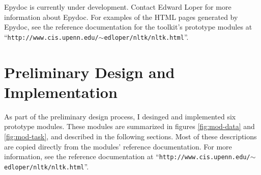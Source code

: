 \documentclass{article}
\begin{document}
Epydoc is currently under development.  Contact Edward Loper for more
information about Epydoc.  For examples of the HTML pages generated by
Epydoc, see the reference documentation for the toolkit's prototype
modules 
at ``\texttt{http://www.cis.upenn.edu/$\sim$edloper/nltk/nltk.html}''.

\section{Preliminary Design and Implementation}

As part of the preliminary design process, I desinged and implemented
six prototype modules.  These modules are summarized in figures
\ref{fig:mod-data} and \ref{fig:mod-task}, and described in the
following sections.  Most of these descriptions are copied directly from
the modules' reference documentation.  For more information, see the
reference documentation 
at ``\texttt{http://www.cis.upenn.edu/$\sim$edloper/nltk/nltk.html}''.
\end{document}
